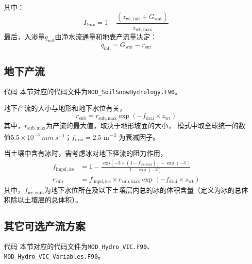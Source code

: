 其中：
\begin{equation}
{I}_{tmp} = 1 - \frac{\left( z_{\mathrm{wt,init}} + {G}_{\mathrm{wat}} \right)}{z_{\mathrm{wt,max}}}
\end{equation}
最后，入渗量$q_{\mathrm{infl}}$由净水流通量和地表产流量决定：
\begin{equation}
  q_{\mathrm{infl}}={G}_{\mathrm{wat}}-r_{\mathrm{sur}}
\end{equation}






\subsection{地下产流} \label{section:rsub_par}
\begin{mymdframed}{代码}
  本节对应的代码文件为\texttt{MOD\_SoilSnowHydrology.F90}。
\end{mymdframed}

地下产流的大小与地形和地下水位有关\citep{niu2005simple}，
\begin{equation}
  r_{\mathrm{sub}} = r_{\mathrm{sub,max}} \exp \left(-f_{\mathrm{drai}} \times z_{\mathrm{wt}}\right)
\end{equation}
其中，$r_{\mathrm{sub,max}}$为产流的最大值，取决于地形坡面的大小，
模式中取全球统一的数值$5.5\times 10^{-3}~\unit{mm~s^{-1}}$；$f_{\mathrm{drai}}=2.5$ \unit{m^{-1}} 为衰减因子。

当土壤中含有冰时，需考虑冰对地下径流的阻力作用，
\begin{equation}
  \begin{aligned}
    f_{\mathrm{impd,ice}} & = 1 - \frac{\exp \left[-3 \times\left(1-f_{\mathrm{ice,sum}}\right)\right]
    -\exp (-3)}{1-\exp (-3)} \\
    r_{\mathrm{sub}} & = f_{\mathrm{impd,ice}} \times r_{\mathrm{sub,max}}
    \exp \left(-f_{\mathrm{drai}} \times z_{\mathrm{wt}}\right)
  \end{aligned}
\end{equation}
其中，$f_{\mathrm{ice,sum}}$为地下水位所在及以下土壤层内总的冰的体积含量（定义为冰的总体积除以土壤层的总体积）。

\subsection{其它可选产流方案}
\begin{mymdframed}{代码}
  本节对应的代码文件为\texttt{MOD\_Hydro\_VIC.F90}、\texttt{MOD\_Hydro\_VIC\_Variables.F90}。
\end{mymdframed}

